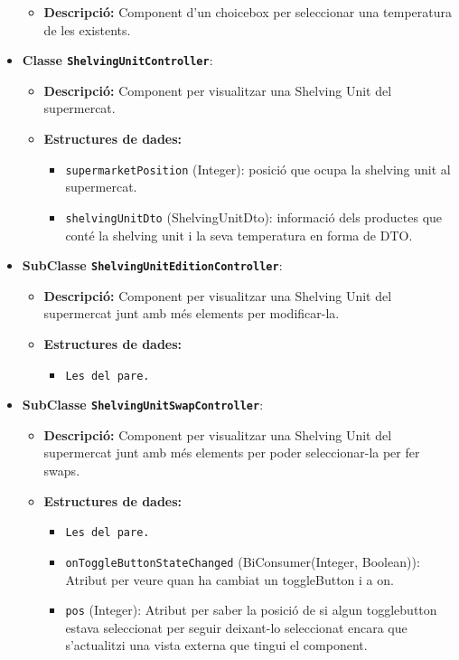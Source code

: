 \documentclass[a4paper,12pt]{report}
\begin{document}
\begin{itemize}
	\begin{itemize}
		\item \textbf{Descripció:} Component d'un choicebox per seleccionar una temperatura de les existents.
	\end{itemize}
	\item \textbf{Classe \texttt{ShelvingUnitController}}:
	\begin{itemize}
		\item \textbf{Descripció:} Component per visualitzar una Shelving Unit del supermercat.
		\item \textbf{Estructures de dades:}
		\begin{itemize}
			\item \texttt{supermarketPosition} (Integer): posició que ocupa la shelving unit al supermercat.
			\item \texttt{shelvingUnitDto} (ShelvingUnitDto): informació dels productes que conté la shelving unit i la seva temperatura en forma de DTO.
		\end{itemize}
	\end{itemize}
	\item \textbf{SubClasse \texttt{ShelvingUnitEditionController}}:
	\begin{itemize}
		\item \textbf{Descripció:} Component per visualitzar una Shelving Unit del supermercat junt amb més elements per modificar-la.
		\item \textbf{Estructures de dades:}
		\begin{itemize}
			\item \texttt{Les del pare.}
		\end{itemize}
	\end{itemize}
	\item \textbf{SubClasse \texttt{ShelvingUnitSwapController}}:
	\begin{itemize}
		\item \textbf{Descripció:} Component per visualitzar una Shelving Unit del supermercat junt amb més elements per poder seleccionar-la per fer swaps.
		\item \textbf{Estructures de dades:}
		\begin{itemize}
			\item \texttt{Les del pare.}
			\item \texttt{onToggleButtonStateChanged} (BiConsumer(Integer, Boolean)): Atribut per veure quan ha cambiat un toggleButton i a on.
			\item \texttt{pos} (Integer): Atribut per saber la posició de si algun togglebutton estava seleccionat per seguir deixant-lo seleccionat encara que s'actualitzi una vista externa que tingui el component.

\end{itemize}
\end{itemize}
\end{itemize}
\end{document}
